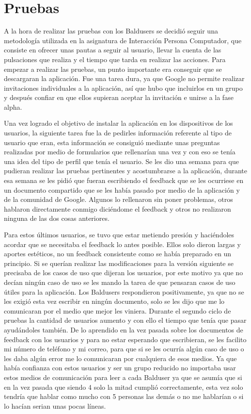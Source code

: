 \section{Pruebas}
\label{secc:pruebas}

A la hora de realizar las pruebas con los Baldusers se decidió seguir una metodología utilizada en la asignatura de Interacción Persona Computador, que consiste en ofrecer unas pautas a seguir al usuario, llevar la cuenta de las pulsaciones que realiza y el tiempo que tarda en realizar las acciones.
Para empezar a realizar las pruebas, un punto importante era conseguir que se descargaran la aplicación.
Fue una tarea dura, ya que Google no permite realizar invitaciones individuales a la aplicación, así que hubo que incluirlos en un grupo y después confiar en que ellos supieran aceptar la invitación e unirse a la fase alpha.

Una vez logrado el objetivo de instalar la aplicación en los dispositivos de los usuarios, la siguiente tarea fue la de pedirles información referente al tipo de usuario que eran, esta información se consiguió mediante unas preguntas realizadas por medio de formularios que rellenarían una vez y con eso se tenía una idea del tipo de perfil que tenía el usuario.
Se les dio una semana para que pudieran realizar las pruebas pertinentes y acostumbrarse a la aplicación, durante esa semana se les pidió que fueran escribiendo el feedback que se les ocurriese en un documento compartido que se les había pasado por medio de la aplicación y de la comunidad de Google.
Algunos lo rellenaron sin poner problemas, otros hablaron directamente conmigo diciéndome el feedback y otros no realizaron ninguna de las dos cosas anteriores.

Para estos últimos usuarios, se tuvo que estar metiendo presión y haciéndoles acordar que se necesitaba el feedback lo antes posible. Ellos solo dieron largas y aportes estéticos, no un feedback consistente como se había preparado en un principio.
Si se querían realizar las modificaciones para la versión siguiente se precisaba de los casos de uso que dijeran los usuarios, por este motivo ya que no decían ningún caso de uso se les mando la tarea de que pensaran casos de uso útiles para la aplicación.
Los Baldusers respondieron positivamente, ya que no se les exigió esta vez escribir en ningún documento, solo se les dijo que me lo comunicaran por el medio que mejor les viniera.
Durante el segundo ciclo de pruebas la cantidad de usuarios aumento y con ello el tiempo que tenía que pasar ayudándoles también.
De lo aprendido en la vez pasada sobre los documentos de feedback con los usuarios y para no estar esperando que escribieran, se les facilito mi número de teléfono y mi correo, para que si se les ocurría algún caso de uso o les daba algún error me lo comunicaran por cualquiera de esos medios. Ya que había confianza con estos usuarios y ser un grupo reducido no importaba usar estos medios de comunicación para leer a cada Balduser ya que se asumía que si en la vez pasada que siendo 4 solo la mitad cumplió correctamente, esta vez solo tendría que hablar como mucho con 5 personas las demás o no me hablarían o si lo hacían serian unas pocas líneas.

